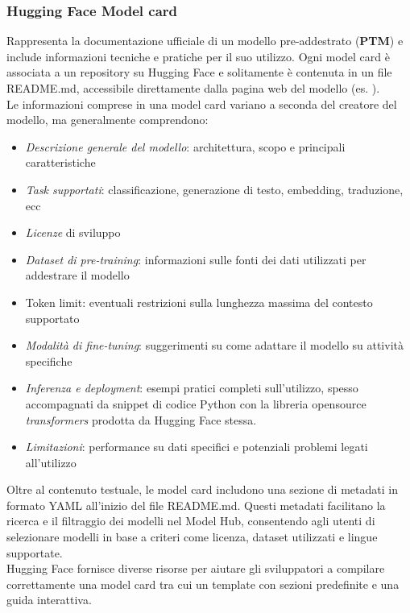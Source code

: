 \documentclass{article}
\begin{document}
\subsubsection{Hugging Face Model card \cite{huggingface_model_cards}} 
Rappresenta la documentazione ufficiale di un modello pre-addestrato (\textbf{PTM})  e include informazioni tecniche e pratiche per il suo utilizzo. Ogni model card è associata a un repository su Hugging Face e solitamente è contenuta in un file README.md, accessibile direttamente dalla pagina web del modello (es. \cite{all-MiniLM-L6-v2}).\\
Le informazioni comprese in una model card variano a seconda del creatore del modello, ma generalmente comprendono:
\begin{itemize}
    \item \textit{Descrizione generale del modello}: architettura, scopo e principali caratteristiche
    \item \textit{Task supportati}: classificazione, generazione di testo, embedding, traduzione, ecc
    \item \textit{Licenze} di sviluppo
    \item \textit{Dataset di pre-training}: informazioni sulle fonti dei dati utilizzati per addestrare il modello
    \item {Token limit}: eventuali restrizioni sulla lunghezza massima del contesto supportato
    \item \textit{Modalità di fine-tuning}: suggerimenti su come adattare il modello su attività specifiche
    \item \textit{Inferenza e deployment}: esempi pratici completi sull'utilizzo, spesso accompagnati da snippet di codice Python con la libreria opensource \textit{transformers}\cite{wolf-etal-2020-transformers} prodotta da Hugging Face stessa.
    \item \textit{Limitazioni}: performance su dati specifici e potenziali problemi legati all’utilizzo
\end{itemize}
Oltre al contenuto testuale, le model card includono una sezione di metadati in formato YAML all'inizio del file README.md. Questi metadati facilitano la ricerca e il filtraggio dei modelli nel Model Hub, consentendo agli utenti di selezionare modelli in base a criteri come licenza, dataset utilizzati e lingue supportate.\\
Hugging Face fornisce diverse risorse per aiutare gli sviluppatori a compilare correttamente una model card tra cui un template con sezioni predefinite e una guida interattiva.\\
\end{document}
